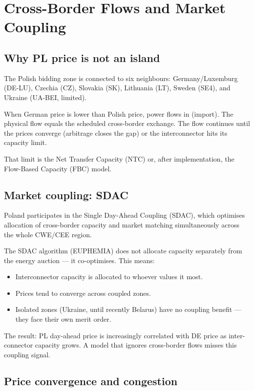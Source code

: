 \section{Cross-Border Flows and Market Coupling}

\subsection{Why PL price is not an island}

The Polish bidding zone is connected to six neighbours:
Germany/Luxemburg (DE-LU), Czechia (CZ), Slovakia (SK),
Lithuania (LT), Sweden (SE4), and Ukraine (UA-BEI, limited).

When German price is lower than Polish price, power flows in (import).
The physical flow equals the scheduled cross-border exchange.
The flow continues until the prices converge (arbitrage closes the gap)
or the interconnector hits its capacity limit.

That limit is the Net Transfer Capacity (NTC) or, after implementation,
the Flow-Based Capacity (FBC) model.

\subsection{Market coupling: SDAC}

Poland participates in the Single Day-Ahead Coupling (SDAC),
which optimises allocation of cross-border capacity and market matching
simultaneously across the whole CWE/CEE region.

The SDAC algorithm (EUPHEMIA) does not allocate capacity separately
from the energy auction — it co-optimises. This means:

\begin{itemize}
  \item Interconnector capacity is allocated to whoever values it most.
  \item Prices tend to converge across coupled zones.
  \item Isolated zones (Ukraine, until recently Belarus) have no coupling
        benefit — they face their own merit order.
\end{itemize}

The result: PL day-ahead price is increasingly correlated with DE price
as inter-connector capacity grows. A model that ignores cross-border
flows misses this coupling signal.

\subsection{Price convergence and congestion}

